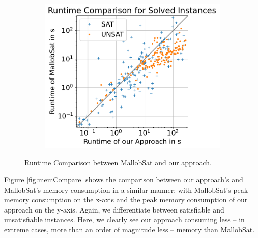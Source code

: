 \documentclass[12pt,a4paper,twoside]{scrartcl}
\numberwithin{equation}{section}
\begin{document}
\begin{figure}[!h]
\begin{subfigure}[c]{.45\textwidth}
  \end{subfigure}
  \begin{subfigure}[c]{.45\textwidth}
    \center
    \includegraphics[scale=.45]{plots/square_runtime_compare/square_runtime_16node.pdf}
    \label{fig:runtimeCompare16node}
  \end{subfigure}
  \caption{Runtime Comparison between MallobSat and our approach.}
  \label{fig:runtimeCompare}
\end{figure}

Figure \ref{fig:memCompare} shows the comparison between our approach's and MallobSat's memory consumption in a similar manner: with MallobSat's peak memory consumption on the x-axis and the peak memory consumption of our approach on the y-axis. Again, we differentiate between satisfiable and unsatisfiable instances. Here, we clearly see our approach consuming less -- in extreme cases, more than an order of magnitude less -- memory than MallobSat.
\end{document}
